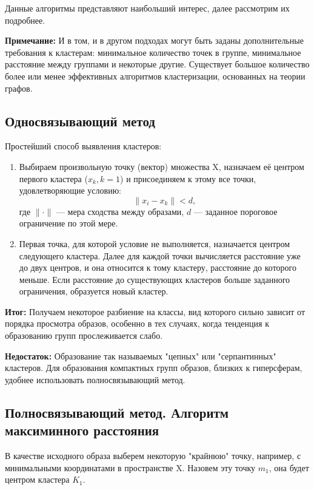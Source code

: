\documentclass[11pt]{article}
\begin{document}
Данные алгоритмы представляют наибольший интерес, далее рассмотрим их подробнее.

\noindent\textbf{Примечание:} И в том, и в другом подходах могут быть заданы дополнительные требования к кластерам: минимальное количество точек в группе, минимальное расстояние между группами и некоторые другие. Существует большое количество более или менее эффективных алгоритмов кластеризации, основанных на теории графов.

\subsection{Односвязывающий метод}

Простейший способ выявления кластеров:

\begin{enumerate}
    \item Выбираем произвольную точку (вектор) множества X, назначаем её центром первого кластера ($x_k, k=1$) и присоединяем к этому все точки, удовлетворяющие условию:
    \[
    \|x_i - x_k\| < d,
    \]
    где $\|\cdot\|$ — мера сходства между образами, $d$ — заданное пороговое ограничение по этой мере.
    
    \item Первая точка, для которой условие не выполняется, назначается центром следующего кластера. Далее для каждой точки вычисляется расстояние уже до двух центров, и она относится к тому кластеру, расстояние до которого меньше. Если расстояние до существующих кластеров больше заданного ограничения, образуется новый кластер.
\end{enumerate}

\textbf{Итог:} Получаем некоторое разбиение на классы, вид которого сильно зависит от порядка просмотра образов, особенно в тех случаях, когда тенденция к образованию групп прослеживается слабо.

\textbf{Недостаток:} Образование так называемых "цепных" или "серпантинных" кластеров. Для образования компактных групп образов, близких к гиперсферам, удобнее использовать полносвязывающий метод.

\subsection{Полносвязывающий метод. Алгоритм максиминного расстояния}

В качестве исходного образа выберем некоторую "крайнюю" точку, например, с минимальными координатами в пространстве X. Назовем эту точку $m_1$, она будет центром кластера $K_1$.
\end{document}
